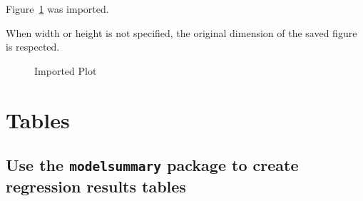 \documentclass[
]{article}
\begin{document}
Figure~\ref{fig-imported-plot} was imported.

When width or height is not specified, the original dimension of the
saved figure is respected.

\begin{figure}


\caption{\label{fig-imported-plot}Imported Plot}

\end{figure}%

\section{Tables}\label{tables}

\subsection{\texorpdfstring{Use the \texttt{modelsummary} package to
create regression results
tables}{Use the modelsummary package to create regression results tables}}\label{use-the-modelsummary-package-to-create-regression-results-tables}

\begin{table}

\caption{\label{tbl-reg-table}Regression results table by the
modelsummary function}


\end{table}%
\end{document}
